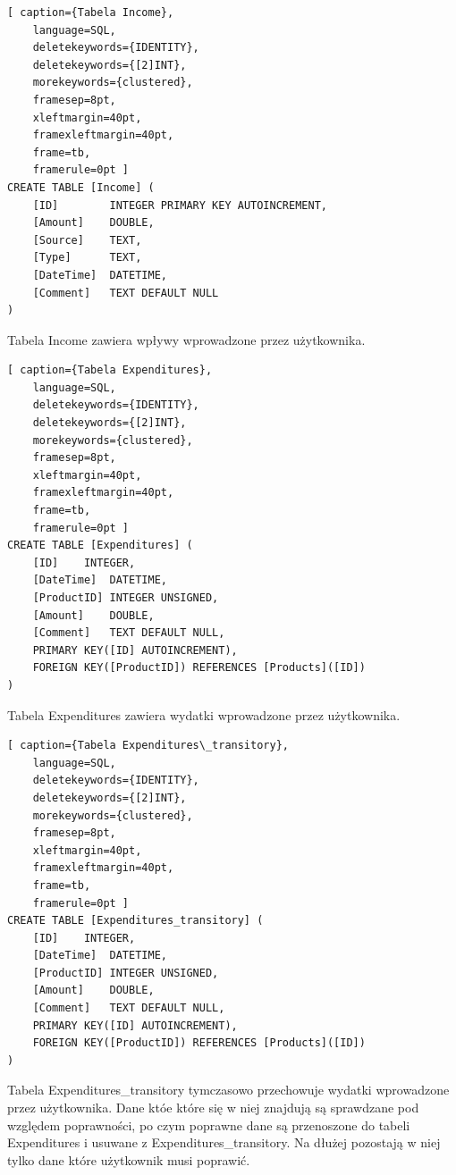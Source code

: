\documentclass[a4paper,10pt]{report}
\begin{document}
\begin{minipage}{\textwidth}
\begin{lstlisting}[ caption={Tabela Income},
    language=SQL,
    deletekeywords={IDENTITY},
    deletekeywords={[2]INT},
    morekeywords={clustered},
    framesep=8pt,
    xleftmargin=40pt,
    framexleftmargin=40pt,
    frame=tb,
    framerule=0pt ]
CREATE TABLE [Income] (
	[ID] 		INTEGER PRIMARY KEY AUTOINCREMENT,
	[Amount]	DOUBLE,
	[Source]	TEXT,
	[Type]		TEXT,
	[DateTime]	DATETIME,
	[Comment]	TEXT DEFAULT NULL
)
\end{lstlisting}
{Tabela Income zawiera wpływy wprowadzone przez użytkownika.}
\end{minipage}

\begin{minipage}{\textwidth}
\begin{lstlisting}[ caption={Tabela Expenditures},
    language=SQL,
    deletekeywords={IDENTITY},
    deletekeywords={[2]INT},
    morekeywords={clustered},
    framesep=8pt,
    xleftmargin=40pt,
    framexleftmargin=40pt,
    frame=tb,
    framerule=0pt ]
CREATE TABLE [Expenditures] (
	[ID]	INTEGER,
	[DateTime]	DATETIME,
	[ProductID]	INTEGER UNSIGNED,
	[Amount]	DOUBLE,
	[Comment]	TEXT DEFAULT NULL,
	PRIMARY KEY([ID] AUTOINCREMENT),
	FOREIGN KEY([ProductID]) REFERENCES [Products]([ID])
)
\end{lstlisting}
{Tabela Expenditures zawiera wydatki wprowadzone przez użytkownika.}
\end{minipage}

\begin{minipage}{\textwidth}
\begin{lstlisting}[ caption={Tabela Expenditures\_transitory},
    language=SQL,
    deletekeywords={IDENTITY},
    deletekeywords={[2]INT},
    morekeywords={clustered},
    framesep=8pt,
    xleftmargin=40pt,
    framexleftmargin=40pt,
    frame=tb,
    framerule=0pt ]
CREATE TABLE [Expenditures_transitory] (
	[ID]	INTEGER,
	[DateTime]	DATETIME,
	[ProductID]	INTEGER UNSIGNED,
	[Amount]	DOUBLE,
	[Comment]	TEXT DEFAULT NULL,
	PRIMARY KEY([ID] AUTOINCREMENT),
	FOREIGN KEY([ProductID]) REFERENCES [Products]([ID])
)
\end{lstlisting}
{Tabela Expenditures\_transitory tymczasowo przechowuje wydatki wprowadzone przez
 użytkownika. Dane któe które się w niej znajdują są sprawdzane pod względem 
 poprawności, po czym poprawne dane są przenoszone do tabeli Expenditures i 
 usuwane z Expenditures\_transitory. Na dłużej pozostają w niej tylko dane które 
 użytkownik musi poprawić.}
\end{minipage}
\end{document}
